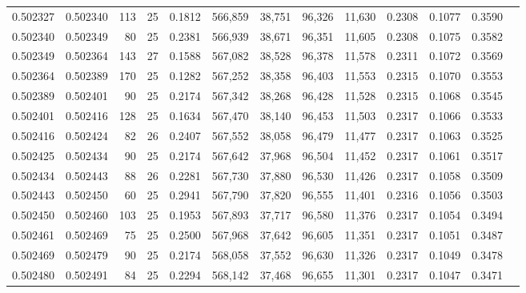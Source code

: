 \begin{tabular}{rrrrrrrrrrrrr}
0.502327 & 0.502340 & 113 &  25 &                                     0.1812 & 566,859 &  38,751 &  96,326 &  11,630 & 0.2308 & 0.1077 & 0.3590 \\
0.502340 & 0.502349 &  80 &  25 &                                     0.2381 & 566,939 &  38,671 &  96,351 &  11,605 & 0.2308 & 0.1075 & 0.3582 \\
0.502349 & 0.502364 & 143 &  27 &                                     0.1588 & 567,082 &  38,528 &  96,378 &  11,578 & 0.2311 & 0.1072 & 0.3569 \\
0.502364 & 0.502389 & 170 &  25 &                                     0.1282 & 567,252 &  38,358 &  96,403 &  11,553 & 0.2315 & 0.1070 & 0.3553 \\
0.502389 & 0.502401 &  90 &  25 &                                     0.2174 & 567,342 &  38,268 &  96,428 &  11,528 & 0.2315 & 0.1068 & 0.3545 \\
0.502401 & 0.502416 & 128 &  25 &                                     0.1634 & 567,470 &  38,140 &  96,453 &  11,503 & 0.2317 & 0.1066 & 0.3533 \\
0.502416 & 0.502424 &  82 &  26 &                                     0.2407 & 567,552 &  38,058 &  96,479 &  11,477 & 0.2317 & 0.1063 & 0.3525 \\
0.502425 & 0.502434 &  90 &  25 &                                     0.2174 & 567,642 &  37,968 &  96,504 &  11,452 & 0.2317 & 0.1061 & 0.3517 \\
0.502434 & 0.502443 &  88 &  26 &                                     0.2281 & 567,730 &  37,880 &  96,530 &  11,426 & 0.2317 & 0.1058 & 0.3509 \\
0.502443 & 0.502450 &  60 &  25 &                                     0.2941 & 567,790 &  37,820 &  96,555 &  11,401 & 0.2316 & 0.1056 & 0.3503 \\
0.502450 & 0.502460 & 103 &  25 &                                     0.1953 & 567,893 &  37,717 &  96,580 &  11,376 & 0.2317 & 0.1054 & 0.3494 \\
0.502461 & 0.502469 &  75 &  25 &                                     0.2500 & 567,968 &  37,642 &  96,605 &  11,351 & 0.2317 & 0.1051 & 0.3487 \\
0.502469 & 0.502479 &  90 &  25 &                                     0.2174 & 568,058 &  37,552 &  96,630 &  11,326 & 0.2317 & 0.1049 & 0.3478 \\
0.502480 & 0.502491 &  84 &  25 &                                     0.2294 & 568,142 &  37,468 &  96,655 &  11,301 & 0.2317 & 0.1047 & 0.3471 \\

\end{tabular}
